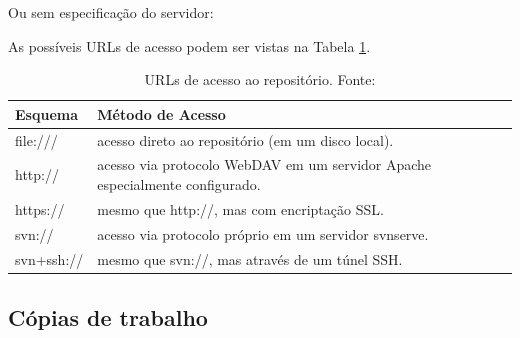 \begin{multicols}{2} 



Ou sem especificação do servidor:

\colorbox{PineGreen}{
\begin{minipage}{200px}
\end{minipage}
}

\end{multicols}

As possíveis URLs de acesso podem ser vistas na Tabela \ref{tab:urls}.

\begin{table}[!h]
\centering
\caption{URLs de acesso ao repositório. Fonte: \cite{svn-book}}
\label{tab:urls}
\begin{tabular}{|l|l|}
\hline
\rowcolor[HTML]{01796F} 
{\color[HTML]{000000} \textbf{Esquema}} & {\color[HTML]{000000} \textbf{Método de Acesso}}                             \\ \hline
file:///                                & acesso direto ao repositório (em um disco local).                            \\ \hline
http://                                 & acesso via protocolo WebDAV em um servidor Apache especialmente configurado. \\ \hline
https://                                & mesmo que http://, mas com encriptação SSL.                                  \\ \hline
svn://                                  & acesso via protocolo próprio em um servidor svnserve.                        \\ \hline
svn+ssh://                              & mesmo que svn://, mas através de um túnel SSH.                               \\ \hline
\end{tabular}
\end{table}



\subsection{Cópias de trabalho}
  
